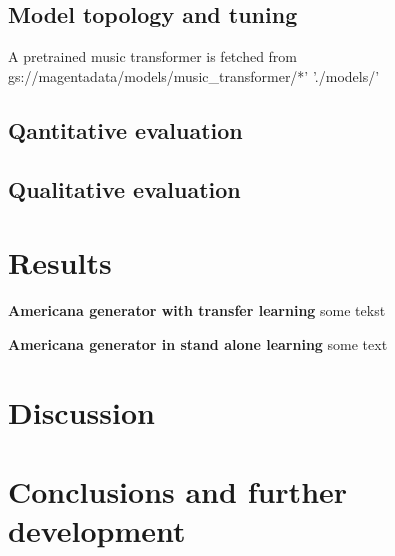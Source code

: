 \documentclass{IEEEtran}
\begin{document}
    \subsection{Model topology and tuning}
    A pretrained music transformer is fetched from gs://magentadata/models/music_transformer/*' './models/'
    \subsection{Qantitative evaluation}
    
    \subsection{Qualitative evaluation}
    
    \section{Results}
    \textbf{Americana generator with transfer learning}
    some tekst

    \textbf{Americana generator in stand alone learning}
    some text
    
    \section{Discussion}
    
    \section{Conclusions and further development}

    \printbibliography
\end{document}
